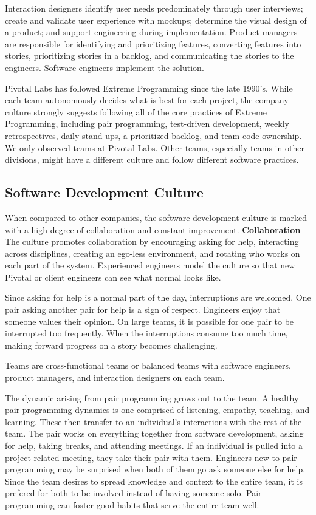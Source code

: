 Interaction designers identify user needs predominately through user interviews; create and validate user experience with mockups; determine the visual design of a product; and support engineering during implementation. Product managers are responsible for identifying and prioritizing features, converting features into stories, prioritizing stories in a backlog, and communicating the stories to the engineers. Software engineers implement the solution. 


Pivotal Labs has followed Extreme Programming \cite{BeckExtremeProgramming2004} since the late 1990's. While each team autonomously decides what is best for each project, the company culture strongly suggests following all of the core practices of Extreme Programming, including pair programming, test-driven development, weekly retrospectives, daily stand-ups, a prioritized backlog, and team code ownership. We only observed teams at Pivotal Labs. Other teams, especially teams in other divisions, might have a different culture and follow different software practices.


\subsection{Software Development Culture}
When compared to other companies, the software development culture is marked with a high degree of collaboration and constant improvement.
\textbf{Collaboration}
The culture promotes collaboration by encouraging asking for help, interacting across disciplines, creating an ego-less environment, and rotating who works on each part of the system. Experienced engineers model the culture so that new Pivotal or client engineers can see what normal looks like.


Since asking for help is a normal part of the day, interruptions are welcomed. One pair asking another pair for help is a sign of respect. Engineers enjoy that someone values their opinion. On large teams, it is possible for one pair to be interrupted too frequently. When the interruptions consume too much time, making forward progress on a story becomes challenging. 


Teams are cross-functional teams or balanced teams with software engineers, product managers, and interaction designers on each team. 


The dynamic arising from pair programming grows out to the team. A healthy pair programming dynamics is one comprised of listening, empathy, teaching, and learning. These then transfer to an individual's interactions with the rest of the team. The pair works on everything together from software development, asking for help, taking breaks, and attending meetings. If an individual is pulled into a project related meeting, they take their pair with them. Engineers new to pair programming may be surprised when both of them go ask someone else for help. Since the team desires to spread knowledge and context to the entire team, it is prefered for both to be involved instead of having someone solo.  Pair programming can foster good habits that serve the entire team well.


